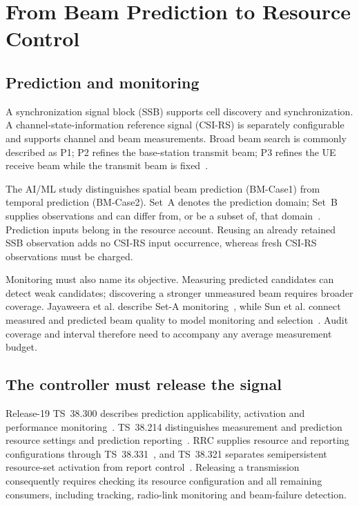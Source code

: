 \documentclass[journal,10pt]{IEEEtran}
\begin{document}
\section{From Beam Prediction to Resource Control}
\subsection{Prediction and monitoring}
A synchronization signal block (SSB) supports cell discovery and synchronization. A channel-state-information reference signal (CSI-RS) is separately configurable and supports channel and beam measurements. Broad beam search is commonly described as P1; P2 refines the base-station transmit beam; P3 refines the UE receive beam while the transmit beam is fixed~\cite{jayaweera2024}.

The AI/ML study distinguishes spatial beam prediction (BM-Case1) from temporal prediction (BM-Case2). Set~A denotes the prediction domain; Set~B supplies observations and can differ from, or be a subset of, that domain~\cite{tr38843,jayaweera2024}. Prediction inputs belong in the resource account. Reusing an already retained SSB observation adds no CSI-RS input occurrence, whereas fresh CSI-RS observations must be charged.

Monitoring must also name its objective. Measuring predicted candidates can detect weak candidates; discovering a stronger unmeasured beam requires broader coverage. Jayaweera et al. describe Set-A monitoring~\cite{jayaweera2024}, while Sun et al. connect measured and predicted beam quality to model monitoring and selection~\cite{sun2024}. Audit coverage and interval therefore need to accompany any average measurement budget.

\subsection{The controller must release the signal}
Release-19 TS~38.300 describes prediction applicability, activation and performance monitoring~\cite{ts38300}. TS~38.214 distinguishes measurement and prediction resource settings and prediction reporting~\cite{ts38214}. RRC supplies resource and reporting configurations through TS~38.331~\cite{ts38331}, and TS~38.321 separates semipersistent resource-set activation from report control~\cite{ts38321}. Releasing a transmission consequently requires checking its resource configuration and all remaining consumers, including tracking, radio-link monitoring and beam-failure detection.
\end{document}
